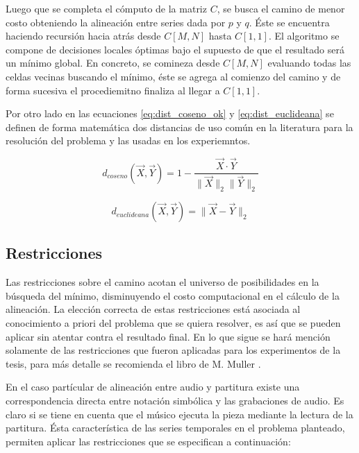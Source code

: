 \documentclass
  [ams,pdfout]%
	{aeslac}
\begin{document}
Luego que se completa el cómputo de la matriz $C$, se busca el camino de menor costo obteniendo la alineación entre series dada por $p$ y $q$. Éste se encuentra haciendo recursión hacia atrás desde $C[M,N]$ hasta $C[1,1]$. El algoritmo se compone de decisiones locales óptimas bajo el supuesto de que el resultado será un mínimo global. En concreto, se comineza desde $C[M,N]$ evaluando todas las celdas vecinas buscando el mínimo, éste se agrega al comienzo del camino y de forma sucesiva el procediemitno finaliza al llegar a $C[1,1]$.


Por otro lado en las ecuaciones \ref{eq:dist_coseno_ok} y \ref{eq:dist_euclideana} se definen de forma matemática dos distancias de uso común en la literatura para la resolución del problema y las usadas en los experiemntos.


\begin{equation}
\label{eq:dist_coseno_ok}
d_{coseno}(\vec{X},\vec{Y}) = 1 - \frac{\vec{X}\cdot\vec{Y}}{\lVert\vec{X}\rVert_{2}\lVert\vec{Y}\rVert_{2}}
\end{equation}

\begin{equation}
\label{eq:dist_euclideana}
d_{euclideana}(\vec{X},\vec{Y}) = \lVert \vec{X} - \vec{Y} \rVert_{2}
\end{equation}


\subsection{Restricciones}
\label{sec:restricciones}

Las restricciones sobre el camino acotan el universo de posibilidades en la búsqueda del mínimo, disminuyendo el costo computacional en el cálculo de la alineación. La elección correcta de estas restricciones está asociada al conocimiento a priori del problema que se quiera resolver, es así que se pueden aplicar sin atentar contra el resultado final. En lo que sigue se hará mención solamente de las restricciones que fueron aplicadas para los experimentos de la tesis, para más detalle se recomienda el libro de M. Muller \cite{muller2007information}.
  
En el caso partícular de alineación entre audio y partitura existe una correspondencia directa entre notación simbólica y las grabaciones de audio. Es claro si se tiene en cuenta que el músico ejecuta la pieza mediante la lectura de la partitura. Ésta característica de las series temporales en el problema planteado, permiten aplicar las restricciones que se especifican a continuación:
\end{document}
